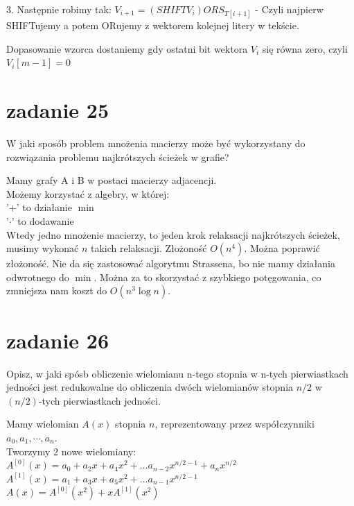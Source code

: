 3. Następnie robimy tak: $V_{i+1} = ( SHIFTV_i) OR S_{T[i+1]}$ - Czyli najpierw SHIFTujemy a potem ORujemy z wektorem kolejnej litery w tekście.

Dopasowanie wzorca dostaniemy gdy ostatni bit wektora $V_i$ się równa zero, czyli $V_i[m-1] = 0$

\section{zadanie 25}
\begin{framed}
W jaki sposób problem mnożenia macierzy może być wykorzystany do rozwiązania problemu najkrótszych ścieżek w grafie?
\end{framed}

Mamy grafy A i B w postaci macierzy adjacencji.\\
Możemy korzystać z algebry, w której:\\
'$+$' to działanie $\min$\\
'$\cdot$' to dodawanie\\
Wtedy jedno mnożenie macierzy, to jeden krok relaksacji najkrótszych ścieżek, musimy wykonać $n$ takich relaksacji. Złożoność $O(n^4)$. Można poprawić złożoność. Nie da się zastosować algorytmu Strassena, bo nie mamy działania odwrotnego do $\min$. Można za to skorzystać z szybkiego potęgowania, co zmniejsza nam koszt do $O(n^3\log n)$.

\section{zadanie 26}
\begin{framed}
Opisz, w jaki spósb obliczenie wielomianu n-tego stopnia w n-tych pierwiastkach jedności jest redukowalne do obliczenia dwóch wielomianów stopnia $n/2$ w $(n/2)$-tych pierwiastkach jedności.
\end{framed}

Mamy wielomian $A(x)$ stopnia $n$, reprezentowany przez współczynniki $a_0, a_1, \cdots, a_n$.\\
Tworzymy $2$ nowe wielomiany:\\
$A^{[0]}(x)=a_0 + a_2 x + a_4 x^2 + ... a_{n-2} x^{n/2 -1} + a_n x^{n/2}$\\
$A^{[1]}(x)=a_1 + a_3 x + a_5 x^2 + ... a_{n-1} x^{n/2 -1}$\\

$A(x) = A^{[0]}(x^2)+xA^{[1]}(x^2)$\\

